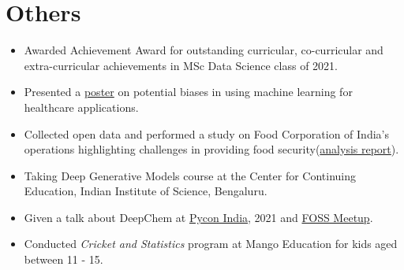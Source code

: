 \documentclass[letterpaper,11pt]{article}
\newcommand{\resumeItemSimple}[1]{
  \item\small{
    {#1 \vspace{-2pt}}
  }
}
\newcommand{\resumeSubItemSimple}[1]{\resumeItemSimple{#1}\vspace{-4pt}}
\newcommand{\resumeSubHeadingListStart}{\begin{itemize}[leftmargin=*]}
\newcommand{\resumeSubHeadingListEnd}{\end{itemize}}
\begin{document}
\section{Others}
  \resumeSubHeadingListStart
    \resumeSubItemSimple {Awarded Achievement Award for outstanding curricular, co-curricular and extra-curricular achievements in MSc Data Science class of 2021.}
    \resumeSubItemSimple {Presented a \href{http://arunppsg.in/assets/files/healthcare_bias.pdf}{poster} on potential biases in using machine learning for healthcare applications.}
    \resumeSubItemSimple {Collected open data and performed a study on Food Corporation of India's operations highlighting challenges in providing food security(\href{http://arunppsg.in/assets/files/FCI.pdf}{analysis report}).}
    \resumeSubItemSimple {Taking Deep Generative Models course at the Center for Continuing Education, Indian Institute of Science, Bengaluru.}
    \resumeSubItemSimple {Given a talk about DeepChem at \href{https://www.youtube.com/watch?v=JEFrzjpf6d0}{Pycon India}, 2021 and \href{https://forum.fossunited.org/t/bangalore-foss-meetup-dec-2022/1397/6}{FOSS Meetup}.}
    \resumeSubItemSimple {Conducted \textit{Cricket and Statistics} program at Mango Education for kids aged between 11 - 15.}
  \resumeSubHeadingListEnd
%
%
\end{document}
